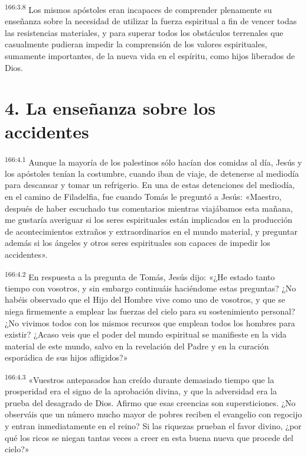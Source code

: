 \par 
\textsuperscript{166:3.8} Los mismos apóstoles eran incapaces de comprender plenamente su enseñanza sobre la necesidad de utilizar la fuerza espiritual a fin de vencer todas las resistencias materiales, y para superar todos los obstáculos terrenales que casualmente pudieran impedir la comprensión de los valores espirituales, sumamente importantes, de la nueva vida en el espíritu, como hijos liberados de Dios.

\section*{4. La enseñanza sobre los accidentes}
\par 
\textsuperscript{166:4.1} Aunque la mayoría de los palestinos sólo hacían dos comidas al día, Jesús y los apóstoles tenían la costumbre, cuando iban de viaje, de detenerse al mediodía para descansar y tomar un refrigerio. En una de estas detenciones del mediodía, en el camino de Filadelfia, fue cuando Tomás le preguntó a Jesús: «Maestro, después de haber escuchado tus comentarios mientras viajábamos esta mañana, me gustaría averiguar si los seres espirituales están implicados en la producción de acontecimientos extraños y extraordinarios en el mundo material, y preguntar además si los ángeles y otros seres espirituales son capaces de impedir los accidentes».

\par 
\textsuperscript{166:4.2} En respuesta a la pregunta de Tomás, Jesús dijo: «¿He estado tanto tiempo con vosotros, y sin embargo continuáis haciéndome estas preguntas? ¿No habéis observado que el Hijo del Hombre vive como uno de vosotros, y que se niega firmemente a emplear las fuerzas del cielo para su sostenimiento personal? ¿No vivimos todos con los mismos recursos que emplean todos los hombres para existir? ¿Acaso veis que el poder del mundo espiritual se manifieste en la vida material de este mundo, salvo en la revelación del Padre y en la curación esporádica de sus hijos afligidos?»

\par 
\textsuperscript{166:4.3} «Vuestros antepasados han creído durante demasiado tiempo que la prosperidad era el signo de la aprobación divina, y que la adversidad era la prueba del desagrado de Dios. Afirmo que esas creencias son supersticiones. ¿No observáis que un número mucho mayor de pobres reciben el evangelio con regocijo y entran inmediatamente en el reino? Si las riquezas prueban el favor divino, ¿por qué los ricos se niegan tantas veces a creer en esta buena nueva que procede del cielo?»

